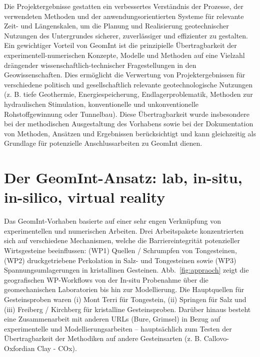Die Projektergebnisse gestatten ein verbessertes Verständnis der Prozesse, der verwendeten Methoden und der anwendungsorientierten Systeme für relevante Zeit- und Längenskalen, um die Planung und Realisierung geotechnischer Nutzungen des Untergrundes sicherer, zuverlässiger und effizienter zu gestalten. Ein gewichtiger Vorteil von GeomInt ist die prinzipielle Übertragbarkeit der experimentell-numerischen Konzepte, Modelle und Methoden auf eine Vielzahl drängender wissenschaftlich-technischer Fragestellungen in den Geowissenschaften. Dies ermöglicht die Verwertung von Projektergebnissen für verschiedene politisch und gesellschaftlich relevante geotechnologische Nutzungen (z. B. tiefe Geothermie, Energiespeicherung, Endlagerproblematik, Methoden zur hydraulischen Stimulation, konventionelle und unkonventionelle Rohstoffgewinnung oder Tunnelbau). Diese Übertragbarkeit wurde insbesondere bei der methodischen Ausgestaltung des Vorhabens sowie bei der Dokumentation von Methoden, Ansätzen und Ergebnissen berücksichtigt und kann gleichzeitig als Grundlage für potenzielle Anschlussarbeiten zu GeomInt dienen.

\section*{Der GeomInt-Ansatz: lab, in-situ, in-silico, virtual reality}

Das GeomInt-Vorhaben basierte auf einer sehr engen Verknüpfung von experimentellen und numerischen Arbeiten. Drei Arbeitspakete konzentrierten sich auf verschiedene Mechanismen, welche die Barriereintegrität potenzieller Wirtsgesteine beeinflussen: (WP1) Quellen / Schrumpfen von Tongesteinen, (WP2) druckgetriebene Perkolation in Salz- und Tongesteinen sowie (WP3) Spannungsumlagerungen in kristallinen Gesteinen.
%
Abb.~\ref{fig:appraoch} zeigt die geografischen WP-Workflows von der In-situ Probenahme über die geomechanischen Laboratorien bis hin zur Modellierung. Die Hauptquellen für Gesteinsproben waren (i) Mont Terri für Tongestein, (ii) Springen für Salz und (iii) Freiberg / Kirchberg für kristalline Gesteinsproben. Darüber hinaus besteht eine Zusammenarbeit mit anderen URLs (Bure, Grimsel) in Bezug auf experimentelle und Modellierungsarbeiten – hauptsächlich zum Testen der Übertragbarkeit der Methodiken auf andere Gesteinsarten (z. B. Callovo-Oxfordian Clay - COx).


